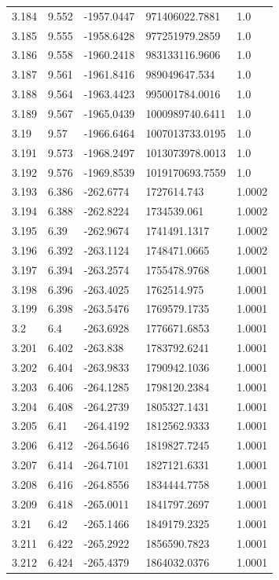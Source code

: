 \begin{tabular}{lllll}
3.184 & 9.552 & -1957.0447 & 971406022.7881 & 1.0 \\
3.185 & 9.555 & -1958.6428 & 977251979.2859 & 1.0 \\
3.186 & 9.558 & -1960.2418 & 983133116.9606 & 1.0 \\
3.187 & 9.561 & -1961.8416 & 989049647.534 & 1.0 \\
3.188 & 9.564 & -1963.4423 & 995001784.0016 & 1.0 \\
3.189 & 9.567 & -1965.0439 & 1000989740.6411 & 1.0 \\
3.19 & 9.57 & -1966.6464 & 1007013733.0195 & 1.0 \\
3.191 & 9.573 & -1968.2497 & 1013073978.0013 & 1.0 \\
3.192 & 9.576 & -1969.8539 & 1019170693.7559 & 1.0 \\
3.193 & 6.386 & -262.6774 & 1727614.743 & 1.0002 \\
3.194 & 6.388 & -262.8224 & 1734539.061 & 1.0002 \\
3.195 & 6.39 & -262.9674 & 1741491.1317 & 1.0002 \\
3.196 & 6.392 & -263.1124 & 1748471.0665 & 1.0002 \\
3.197 & 6.394 & -263.2574 & 1755478.9768 & 1.0001 \\
3.198 & 6.396 & -263.4025 & 1762514.975 & 1.0001 \\
3.199 & 6.398 & -263.5476 & 1769579.1735 & 1.0001 \\
3.2 & 6.4 & -263.6928 & 1776671.6853 & 1.0001 \\
3.201 & 6.402 & -263.838 & 1783792.6241 & 1.0001 \\
3.202 & 6.404 & -263.9833 & 1790942.1036 & 1.0001 \\
3.203 & 6.406 & -264.1285 & 1798120.2384 & 1.0001 \\
3.204 & 6.408 & -264.2739 & 1805327.1431 & 1.0001 \\
3.205 & 6.41 & -264.4192 & 1812562.9333 & 1.0001 \\
3.206 & 6.412 & -264.5646 & 1819827.7245 & 1.0001 \\
3.207 & 6.414 & -264.7101 & 1827121.6331 & 1.0001 \\
3.208 & 6.416 & -264.8556 & 1834444.7758 & 1.0001 \\
3.209 & 6.418 & -265.0011 & 1841797.2697 & 1.0001 \\
3.21 & 6.42 & -265.1466 & 1849179.2325 & 1.0001 \\
3.211 & 6.422 & -265.2922 & 1856590.7823 & 1.0001 \\
3.212 & 6.424 & -265.4379 & 1864032.0376 & 1.0001 \\

\end{tabular}
